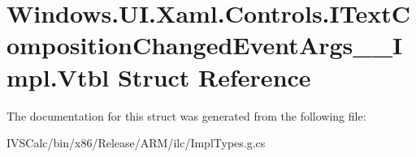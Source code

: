 \hypertarget{struct_windows_1_1_u_i_1_1_xaml_1_1_controls_1_1_i_text_composition_changed_event_args_____impl_1_1_vtbl}{}\section{Windows.\+U\+I.\+Xaml.\+Controls.\+I\+Text\+Composition\+Changed\+Event\+Args\+\_\+\+\_\+\+Impl.\+Vtbl Struct Reference}
\label{struct_windows_1_1_u_i_1_1_xaml_1_1_controls_1_1_i_text_composition_changed_event_args_____impl_1_1_vtbl}


The documentation for this struct was generated from the following file\+:\begin{DoxyCompactItemize}
\item 
I\+V\+S\+Calc/bin/x86/\+Release/\+A\+R\+M/ilc/Impl\+Types.\+g.\+cs\end{DoxyCompactItemize}
